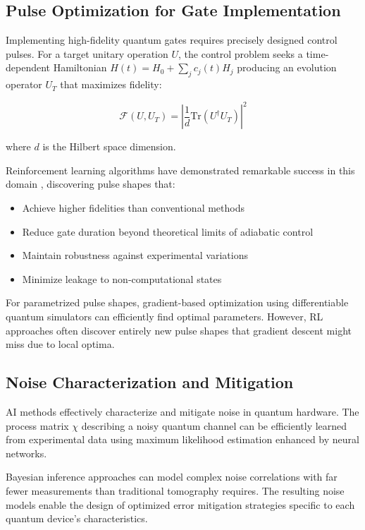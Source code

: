\subsection{Pulse Optimization for Gate Implementation}
Implementing high-fidelity quantum gates requires precisely designed control pulses. For a target unitary operation $U$, the control problem seeks a time-dependent Hamiltonian $H(t) = H_0 + \sum_j c_j(t) H_j$ producing an evolution operator $U_T$ that maximizes fidelity:

\begin{equation}
\mathcal{F}(U, U_T) = \left|\frac{1}{d}\text{Tr}(U^\dagger U_T)\right|^2
\end{equation}

where $d$ is the Hilbert space dimension.

Reinforcement learning algorithms have demonstrated remarkable success in this domain \cite{ding2021breaking}, discovering pulse shapes that:

\begin{itemize}
    \item Achieve higher fidelities than conventional methods
    \item Reduce gate duration beyond theoretical limits of adiabatic control
    \item Maintain robustness against experimental variations
    \item Minimize leakage to non-computational states
\end{itemize}

For parametrized pulse shapes, gradient-based optimization using differentiable quantum simulators can efficiently find optimal parameters. However, RL approaches often discover entirely new pulse shapes that gradient descent might miss due to local optima.

\subsection{Noise Characterization and Mitigation}
AI methods effectively characterize and mitigate noise in quantum hardware. The process matrix $\chi$ describing a noisy quantum channel can be efficiently learned from experimental data using maximum likelihood estimation enhanced by neural networks.

Bayesian inference approaches can model complex noise correlations with far fewer measurements than traditional tomography requires. The resulting noise models enable the design of optimized error mitigation strategies specific to each quantum device's characteristics. 